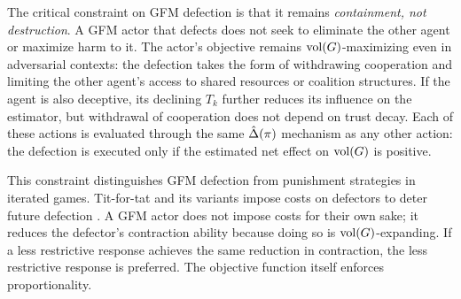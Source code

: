The critical constraint on GFM defection is that it remains \emph{containment,
not destruction}. A GFM actor that defects does not seek to eliminate the other
agent or maximize harm to it. The actor's objective remains
$\operatorname{vol}(G)$-maximizing even in adversarial contexts: the defection takes the form
of withdrawing cooperation and limiting the other agent's access to shared
resources or coalition structures. If the agent is also deceptive, its
declining $T_k$ further reduces its influence on the estimator, but withdrawal
of cooperation does not depend on trust decay. Each of these actions is
evaluated through the same $\hat{\Delta}(\pi)$ mechanism as any other action: the
defection is executed only if the estimated net effect on $\operatorname{vol}(G)$ is
positive.

This constraint distinguishes GFM defection from punishment strategies in
iterated games. Tit-for-tat and its variants impose costs on defectors to deter
future defection \citep{axelrod1984evolution}. A GFM actor does not impose
costs for their own sake; it reduces the defector's contraction ability because
doing so is $\operatorname{vol}(G)$-expanding. If a less restrictive response achieves the
same reduction in contraction, the less restrictive response is preferred. The
objective function itself enforces proportionality.
